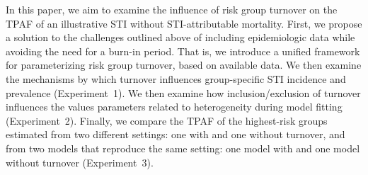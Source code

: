 \par
In this paper, we aim to examine the influence of risk group turnover
on the TPAF of an illustrative STI without STI-attributable mortality.
First, we propose a solution to the challenges outlined above
of including epidemiologic data while avoiding the need for a burn-in period.
That is, we introduce a unified framework for
parameterizing risk group turnover, based on available data.
We then examine the mechanisms by which turnover
influences group-specific STI incidence and prevalence
(Experiment~1).
We then examine how inclusion/exclusion of turnover influences
the values parameters related to heterogeneity during model fitting
(Experiment~2).
Finally, we compare the TPAF of the highest-risk groups estimated
from two different settings: one with and one without turnover,
and from two models that reproduce the same setting:
one model with and one model without turnover
(Experiment~3).